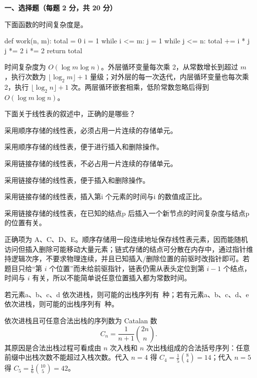 

\textbf{一、选择题（每题 2 分，共 20 分）}
\begin{question}
下面函数的时间复杂度是\blank。
\begin{pycode}
def work(n, m):
    total = 0
    i = 1
    while i <= m:
        j = 1
        while j <= n:
            total += i * j
            j *= 2
        i *= 2
    return total
\end{pycode}
\begin{solution}
时间复杂度为 $O(\log m\log n)$。外层循环变量每次乘 2，从常数增长到超过 $m$，执行次数为 $\lfloor\log_2 m\rfloor+1$ 量级；对外层的每一次迭代，内层循环变量也每次乘 2，执行 $\lfloor\log_2 n\rfloor+1$ 次。两层循环嵌套相乘，低阶常数忽略后得到 $O(\log m\log n)$。
\end{solution}
\end{question}

\begin{question}
下面关于线性表的叙述中，正确的是哪些？
\begin{choiceoptions}[1]
  \item 采用顺序存储的线性表，必须占用一片连续的存储单元。
  \item 采用顺序存储的线性表，便于进行插入和删除操作。
  \item 采用链接存储的线性表，不必占用一片连续的存储单元。
  \item 采用链接存储的线性表，便于插入和删除操作。
  \item 采用链接存储的线性表，插入第i 个元素的时间与i 的数值成正比。
  \item 采用链接存储的线性表，在已知的结点p 后插入一个新节点的时间复杂度与结点p 的位置有关。
\end{choiceoptions}
\begin{solution}
正确项为 A、C、D、E。顺序存储用一段连续地址保存线性表元素，因而能随机访问但插入删除可能移动大量元素；链式存储的结点可分散在内存中，通过指针维持逻辑次序，不要求物理连续，并且已知插入/删除位置的前驱时改指针即可。若题目只给“第 $i$ 个位置”而未给前驱指针，链表仍需从表头定位到第 $i-1$ 个结点，时间与 $i$ 有关，所以不能简单说任意位置插入都为常数时间。
\end{solution}
\end{question}

\begin{question}
若元素a、b、c、d 依次进栈，则可能的出栈序列有\blank\ 种；若有元素a、b、c、d、e 依次进栈，则可能的出栈序列有\blank\ 种。
\begin{solution}
依次进栈且可任意合法出栈的序列数为 Catalan 数
\[
C_n=\frac{1}{n+1}\binom{2n}{n}.
\]
其原因是合法出栈过程可看成由 $n$ 次入栈和 $n$ 次出栈组成的合法括号序列：任意前缀中出栈次数不能超过入栈次数。代入 $n=4$ 得 $C_4=\frac15\binom84=14$；代入 $n=5$ 得 $C_5=\frac16\binom{10}{5}=42$。
\end{solution}
\end{question}


